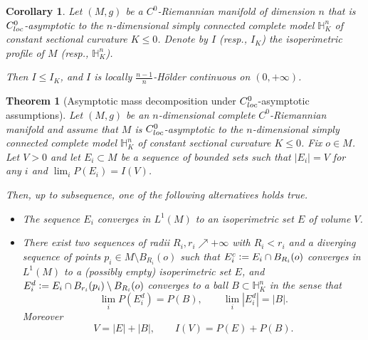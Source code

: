 \documentclass[10pt,a4paper]{amsart}
\newtheorem{theorem}{Theorem}
\newtheorem{corollary}{Corollary}
\newcommand{\eqdef}{\ensuremath{\vcentcolon=}}
\begin{document}
\begin{corollary}\label{cor:Continuity}
Let $(M,g)$ be a $C^0$-Riemannian manifold of dimension $n$ that is $C^0_{\rm loc}$-asymptotic to the $n$-dimensional simply connected complete model $\mathbb H^n_K$ of constant sectional curvature $K\le 0$. Denote by $I$ (resp., $I_K$) the isoperimetric profile of $M$ (resp., $\mathbb{H}^n_K$).

Then $I\le I_K$, and $I$ is locally $\tfrac{n-1}{n}$-H\"{o}lder continuous on $(0,+\infty)$.
\end{corollary}

\begin{theorem}[Asymptotic mass decomposition under $C^0_{\rm loc}$-asymptotic assumptions]\label{thm:MassDecompositionC0}
Let $(M, g)$ be an $n$-dimensional complete $C^0$-Riemannian manifold and assume that $M$ is $C^0_{\rm loc}$-asymptotic to the $n$-dimensional simply connected complete model $\mathbb H^n_K$ of constant sectional curvature $K\le 0$. Fix $o \in M$. Let $V>0$ and let $E_i\subset M$ be a sequence of bounded sets such that $|E_i|=V$ for any $i$ and $\lim_i P(E_i)= I(V)$.

Then, up to subsequence, one of the following alternatives holds true.
\begin{itemize}
    \item The sequence $E_i$ converges in $L^1(M)$ to an isoperimetric set $E$ of volume $V$.

    \item There exist two sequences of radii $R_i, r_i\nearrow+\infty$ with $R_i<r_i$ and a diverging sequence of points $p_i \in M\setminus B_{R_i}(o)$ such that $E_i^c\eqdef E_i \cap B_{R_i}(o)$ converges in $L^1(M)$ to a (possibly empty) isoperimetric set $E$, and $E_i^d\eqdef E_i \cap B_{r_i}(p_i) \setminus B_{R_i}(o)$ converges
    to a ball $B\subset \mathbb H^n_K$ in the sense that
    \[
    \lim_i P(E_i^d) = P(B) , 
        \qquad
    \lim_i |E_i^d| = |B|.
    \]
    Moreover
    \begin{equation*}
        V= |E| + |B|,
        \qquad
        I(V) = P(E) + P(B) .
    \end{equation*}
\end{itemize}
\end{theorem}
\end{document}
